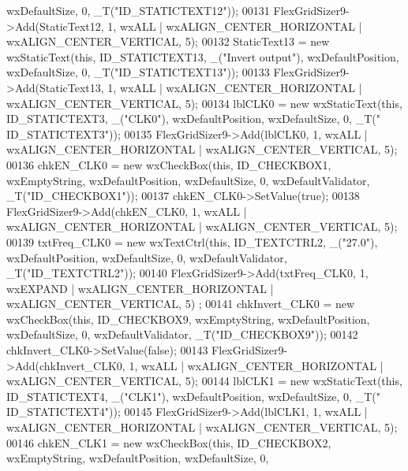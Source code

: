 \begin{DoxyCode}
      wxDefaultSize, 0, \_T(\textcolor{stringliteral}{"ID\_STATICTEXT12"}));
00131     FlexGridSizer9->Add(StaticText12, 1, wxALL | wxALIGN\_CENTER\_HORIZONTAL | wxALIGN\_CENTER\_VERTICAL, 5);
00132     StaticText13 = \textcolor{keyword}{new} wxStaticText(\textcolor{keyword}{this}, ID\_STATICTEXT13, \_(\textcolor{stringliteral}{"Invert output"}), wxDefaultPosition, 
      wxDefaultSize, 0, \_T(\textcolor{stringliteral}{"ID\_STATICTEXT13"}));
00133     FlexGridSizer9->Add(StaticText13, 1, wxALL | wxALIGN\_CENTER\_HORIZONTAL | wxALIGN\_CENTER\_VERTICAL, 5);
00134     lblCLK0 = \textcolor{keyword}{new} wxStaticText(\textcolor{keyword}{this}, ID\_STATICTEXT3, \_(\textcolor{stringliteral}{"CLK0"}), wxDefaultPosition, wxDefaultSize, 0, \_T(\textcolor{stringliteral}{"
      ID\_STATICTEXT3"}));
00135     FlexGridSizer9->Add(lblCLK0, 1, wxALL | wxALIGN\_CENTER\_HORIZONTAL | wxALIGN\_CENTER\_VERTICAL, 5);
00136     chkEN\_CLK0 = \textcolor{keyword}{new} wxCheckBox(\textcolor{keyword}{this}, ID\_CHECKBOX1, wxEmptyString, wxDefaultPosition, wxDefaultSize, 0, 
      wxDefaultValidator, \_T(\textcolor{stringliteral}{"ID\_CHECKBOX1"}));
00137     chkEN\_CLK0->SetValue(\textcolor{keyword}{true});
00138     FlexGridSizer9->Add(chkEN\_CLK0, 1, wxALL | wxALIGN\_CENTER\_HORIZONTAL | wxALIGN\_CENTER\_VERTICAL, 5);
00139     txtFreq\_CLK0 = \textcolor{keyword}{new} wxTextCtrl(\textcolor{keyword}{this}, ID\_TEXTCTRL2, \_(\textcolor{stringliteral}{"27.0"}), wxDefaultPosition, wxDefaultSize, 0, 
      wxDefaultValidator, \_T(\textcolor{stringliteral}{"ID\_TEXTCTRL2"}));
00140     FlexGridSizer9->Add(txtFreq\_CLK0, 1, wxEXPAND | wxALIGN\_CENTER\_HORIZONTAL | wxALIGN\_CENTER\_VERTICAL, 5)
      ;
00141     chkInvert\_CLK0 = \textcolor{keyword}{new} wxCheckBox(\textcolor{keyword}{this}, ID\_CHECKBOX9, wxEmptyString, wxDefaultPosition, wxDefaultSize, 0,
       wxDefaultValidator, \_T(\textcolor{stringliteral}{"ID\_CHECKBOX9"}));
00142     chkInvert\_CLK0->SetValue(\textcolor{keyword}{false});
00143     FlexGridSizer9->Add(chkInvert\_CLK0, 1, wxALL | wxALIGN\_CENTER\_HORIZONTAL | wxALIGN\_CENTER\_VERTICAL, 5);
00144     lblCLK1 = \textcolor{keyword}{new} wxStaticText(\textcolor{keyword}{this}, ID\_STATICTEXT4, \_(\textcolor{stringliteral}{"CLK1"}), wxDefaultPosition, wxDefaultSize, 0, \_T(\textcolor{stringliteral}{"
      ID\_STATICTEXT4"}));
00145     FlexGridSizer9->Add(lblCLK1, 1, wxALL | wxALIGN\_CENTER\_HORIZONTAL | wxALIGN\_CENTER\_VERTICAL, 5);
00146     chkEN\_CLK1 = \textcolor{keyword}{new} wxCheckBox(\textcolor{keyword}{this}, ID\_CHECKBOX2, wxEmptyString, wxDefaultPosition, wxDefaultSize, 0, 

\end{DoxyCode}
